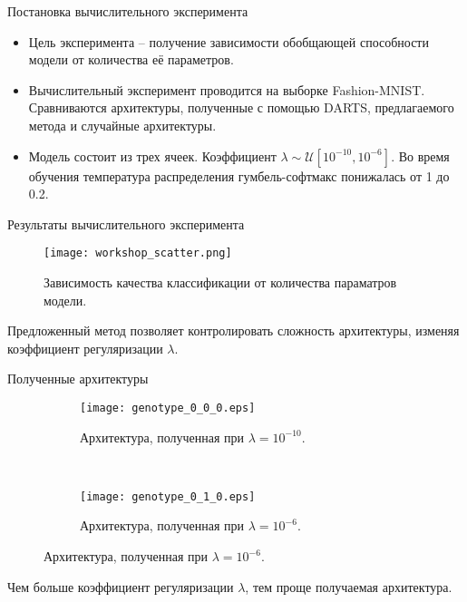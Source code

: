 \documentclass[aspectratio=169]{beamer}
\begin{document}
\begin{frame}{Постановка вычислительного эксперимента}


\begin{itemize}
\item Цель эксперимента -- получение зависимости обобщающей способности модели от количества её параметров.
\item Вычислительный эксперимент проводится на выборке Fashion-MNIST. Сравниваются архитектуры, полученные с помощью DARTS, предлагаемого метода и случайные архитектуры.
\item Модель состоит из трех ячеек. Коэффициент $\lambda \sim \mathcal{U}[10^{-10}, 10^{-6}]$.  Во время обучения температура распределения гумбель-софтмакс понижалась от 1 до 0.2.
\end{itemize}

\end{frame}





\begin{frame}{Результаты вычислительного эксперимента}
\begin{figure}
    \centering
    \texttt{[image: workshop\_scatter.png]}
    \caption*{Зависимость качества классификации от количества параматров модели.}
\end{figure}
Предложенный метод позволяет контролировать сложность архитектуры, изменяя коэффициент регуляризации $\lambda$.

\end{frame}


\begin{frame}{Полученные архитектуры}

\begin{figure}[H]
\centering
\begin{subfigure}{0.6\textwidth}
  \centering
  \texttt{[image: genotype\_0\_0\_0.eps]}
  \caption{Архитектура, полученная при $\lambda = 10^{-10}$.}
\end{subfigure}%
\\
\begin{subfigure}{0.6\textwidth}
  \centering
  \texttt{[image: genotype\_0\_1\_0.eps]}
  \caption{Архитектура, полученная при $\lambda = 10^{-6}$.}
\end{subfigure}
\end{figure}
Чем больше коэффициент регуляризации $\lambda$, тем проще получаемая архитектура.
\end{frame}
\end{document}
